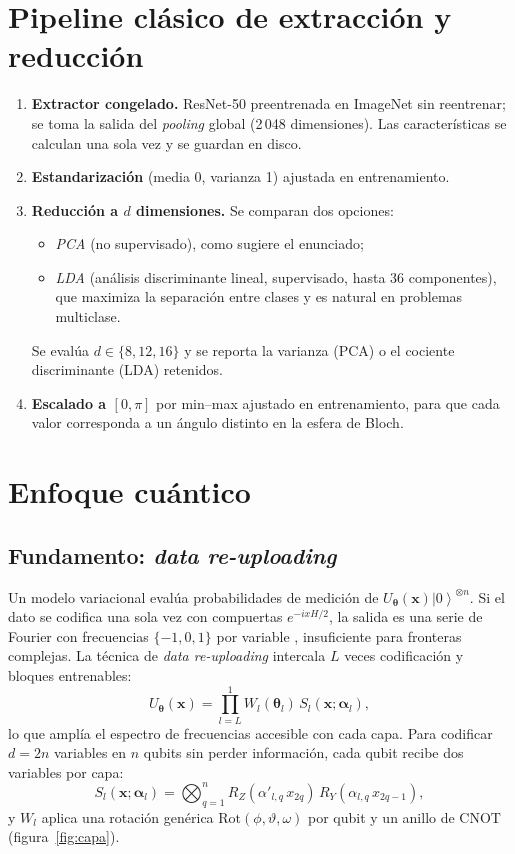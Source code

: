 \documentclass[11pt,letterpaper]{article}
\providecommand{\ket}[1]{\left|#1\right\rangle}
\begin{document}
\section{Pipeline clásico de extracción y reducción}
\begin{enumerate}[leftmargin=*]
\item \textbf{Extractor congelado.} ResNet-50 preentrenada en ImageNet \cite{he2016} sin reentrenar;
se toma la salida del \emph{pooling} global (2\,048 dimensiones). Las características se calculan una
sola vez y se guardan en disco.
\item \textbf{Estandarización} (media 0, varianza 1) ajustada en entrenamiento.
\item \textbf{Reducción a $d$ dimensiones.} Se comparan dos opciones:
  \begin{itemize}
  \item \emph{PCA} (no supervisado), como sugiere el enunciado;
  \item \emph{LDA} (análisis discriminante lineal, supervisado, hasta 36 componentes), que maximiza
  la separación entre clases y es natural en problemas multiclase.
  \end{itemize}
  Se evalúa $d\in\{8,12,16\}$ y se reporta la varianza (PCA) o el cociente discriminante (LDA) retenidos.
\item \textbf{Escalado a $[0,\pi]$} por min--max ajustado en entrenamiento, para que cada valor
corresponda a un ángulo distinto en la esfera de Bloch.
\end{enumerate}

\section{Enfoque cuántico}
\subsection{Fundamento: \emph{data re-uploading}}
Un modelo variacional evalúa probabilidades de medición de $U_{\bm\theta}(\bm{x})\ket{0}^{\otimes n}$.
Si el dato se codifica una sola vez con compuertas $e^{-ixH/2}$, la salida es una serie de Fourier con
frecuencias $\{-1,0,1\}$ por variable \cite{schuld2021}, insuficiente para fronteras complejas. La
técnica de \emph{data re-uploading} \cite{perez2020} intercala $L$ veces codificación y bloques
entrenables:
\begin{equation}
U_{\bm\theta}(\bm{x})=\prod_{l=L}^{1}W_l(\bm\theta_l)\,S_l(\bm{x};\bm\alpha_l),
\end{equation}
lo que amplía el espectro de frecuencias accesible con cada capa. Para codificar $d=2n$ variables en
$n$ qubits sin perder información, cada qubit recibe dos variables por capa:
\begin{equation}
S_l(\bm{x};\bm\alpha_l)=\bigotimes_{q=1}^{n}R_Z(\alpha'_{l,q}\,x_{2q})\,R_Y(\alpha_{l,q}\,x_{2q-1}),
\end{equation}
y $W_l$ aplica una rotación genérica $\mathrm{Rot}(\phi,\vartheta,\omega)$ por qubit y un anillo de
CNOT (figura~\ref{fig:capa}).
\end{document}
